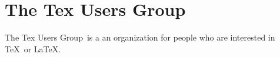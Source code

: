 \documentclass[a4paper, 11pt]{article}
\newcommand{\TUG}{Tex Users Group}
\begin{document}
  \section*{The \TUG}
    The \TUG\ is a an organization for people who are interested in \TeX\ or \LaTeX.
\end{document}
